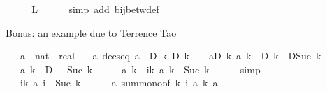 \begin{isabellebody}
\ \ \isamarkupfalse%
\ \isamarkupfalse%
\ {\isacharquery}{\kern0pt}L\isanewline
\ \ \ \ \isamarkupfalse%
\ {\isacharparenleft}{\kern0pt}simp\ add{\isacharcolon}{\kern0pt}\ bij{\isacharunderscore}{\kern0pt}betw{\isacharunderscore}{\kern0pt}def{\isacharparenright}{\kern0pt}\isanewline
{}\isamarkupfalse%
%
\endisatagproof
{\isafoldproof}%
%
\isadelimproof
%
\endisadelimproof
%
\begin{isamarkuptext}%
Bonus: an example due to Terrence Tao%
\end{isamarkuptext}\isamarkuptrue%
\isamarkupfalse%
\isanewline
\ \ \ a\ {\isacharcolon}{\kern0pt}{\isacharcolon}{\kern0pt}\ {\isachardoublequoteopen}nat\ {\isasymRightarrow}\ real{\isachardoublequoteclose}\isanewline
\ \ \ a{\isacharcolon}{\kern0pt}\ {\isachardoublequoteopen}decseq\ a{\isachardoublequoteclose}\ \ D{\isacharcolon}{\kern0pt}\ {\isachardoublequoteopen}{\isasymAnd}k{\isachardot}{\kern0pt}\ D\ k\ {\isasymge}\ {}{\isachardoublequoteclose}\ \ aD{\isacharcolon}{\kern0pt}\ {\isachardoublequoteopen}{\isasymAnd}k{\isachardot}{\kern0pt}\ a\ k\ {\isasymle}\ D\ k\ {\isacharminus}{\kern0pt}\ D{\isacharparenleft}{\kern0pt}Suc\ k{\isacharparenright}{\kern0pt}{\isachardoublequoteclose}\isanewline
\ \ \ {\isachardoublequoteopen}a\ k\ {\isasymle}\ D\ {}\ {\isacharslash}{\kern0pt}\ {\isacharparenleft}{\kern0pt}Suc\ k{\isacharparenright}{\kern0pt}{\isachardoublequoteclose}\isanewline
%
\isadelimproof
%
\endisadelimproof
%
\isatagproof
{}\isamarkupfalse%
\ {\isacharminus}{\kern0pt}\isanewline
\ \ \isamarkupfalse%
\ {\isachardoublequoteopen}a\ k\ {\isacharequal}{\kern0pt}\ {\isacharparenleft}{\kern0pt}{\isasymSum}i{\isasymle}k{\isachardot}{\kern0pt}\ a\ k{\isacharparenright}{\kern0pt}\ {\isacharslash}{\kern0pt}\ {\isacharparenleft}{\kern0pt}Suc\ k{\isacharparenright}{\kern0pt}{\isachardoublequoteclose}\isanewline
\ \ \ \ \isamarkupfalse%
\ simp\isanewline
\ \ \isamarkupfalse%
\ \isamarkupfalse%
\ {\isachardoublequoteopen}{\isasymdots}\ {\isasymle}\ {\isacharparenleft}{\kern0pt}{\isasymSum}i{\isasymle}k{\isachardot}{\kern0pt}\ a\ i{\isacharparenright}{\kern0pt}\ {\isacharslash}{\kern0pt}\ {\isacharparenleft}{\kern0pt}Suc\ k{\isacharparenright}{\kern0pt}{\isachardoublequoteclose}\isanewline
\ \ \ \ \isamarkupfalse%
\ a\ sum{\isacharunderscore}{\kern0pt}mono{\isacharbrackleft}{\kern0pt}of\ {\isachardoublequoteopen}{\isacharbraceleft}{\kern0pt}{\isachardot}{\kern0pt}{\isachardot}{\kern0pt}k{\isacharbraceright}{\kern0pt}{\isachardoublequoteclose}\ {\isachardoublequoteopen}{\isasymlambda}i{\isachardot}{\kern0pt}\ a\ k{\isachardoublequoteclose}\ a{\isacharbrackright}{\kern0pt}\ \isanewline

\end{isabellebody}
